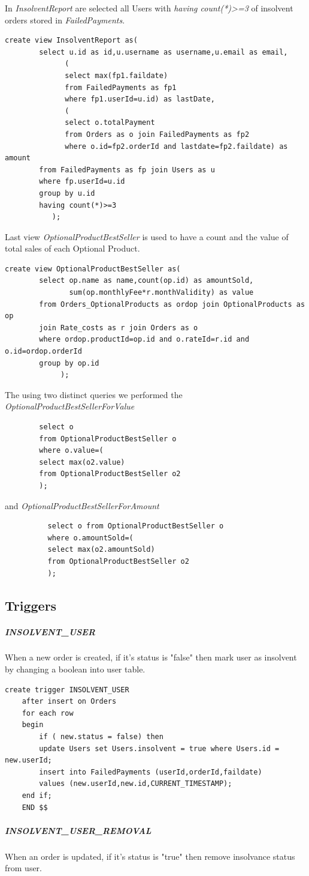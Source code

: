 \documentclass{article}
\begin{document}
In \emph{InsolventReport} are selected all Users with \emph{having count(*)>=3} of insolvent orders stored in \emph{FailedPayments}.
\begin{lstlisting}
create view InsolventReport as(
        select u.id as id,u.username as username,u.email as email,
              (
              select max(fp1.faildate) 
              from FailedPayments as fp1  
              where fp1.userId=u.id) as lastDate,
              (
              select o.totalPayment 
              from Orders as o join FailedPayments as fp2 
              where o.id=fp2.orderId and lastdate=fp2.faildate) as amount
        from FailedPayments as fp join Users as u
        where fp.userId=u.id
        group by u.id
        having count(*)>=3
           );
\end{lstlisting}

Last view  \emph{OptionalProductBestSeller} is used to have a count and the value of total sales of each Optional Product.
\begin{lstlisting}
create view OptionalProductBestSeller as(
        select op.name as name,count(op.id) as amountSold, 
               sum(op.monthlyFee*r.monthValidity) as value
        from Orders_OptionalProducts as ordop join OptionalProducts as op 
        join Rate_costs as r join Orders as o
        where ordop.productId=op.id and o.rateId=r.id and o.id=ordop.orderId
        group by op.id
             );
\end{lstlisting}
The using two distinct queries we performed the  \emph{OptionalProductBestSellerForValue}
\begin{lstlisting}
        select o 
        from OptionalProductBestSeller o 
        where o.value=(
        select max(o2.value) 
        from OptionalProductBestSeller o2
        );
\end{lstlisting}
and  \emph{OptionalProductBestSellerForAmount}
\begin{lstlisting}
          select o from OptionalProductBestSeller o 
          where o.amountSold=(
          select max(o2.amountSold) 
          from OptionalProductBestSeller o2
          );
\end{lstlisting}
\newpage
\subsection{Triggers}
\subparagraph{INSOLVENT_USER}
When a new order is created, if it's status is "false" then mark user as insolvent by changing a boolean into user table.
\begin{lstlisting}
create trigger INSOLVENT_USER
    after insert on Orders
    for each row
	begin
		if ( new.status = false) then
		update Users set Users.insolvent = true where Users.id = new.userId;
		insert into FailedPayments (userId,orderId,faildate) 
		values (new.userId,new.id,CURRENT_TIMESTAMP);
	end if;
	END $$
\end{lstlisting}
\subparagraph{INSOLVENT_USER_REMOVAL}
When an order is updated, if it's status is "true" then remove insolvance status from user.
\end{document}

